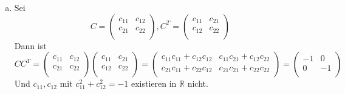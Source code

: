 \documentclass{scrreprt}
\begin{document}
\begin{enumerate}[(a)]
\begin{enumerate}[(a)]
  \item Sei
    \[
      C = \begin{pmatrix}
        c_{11} & c_{12} \\
        c_{21} & c_{22} \\
      \end{pmatrix},
      C^T = \begin{pmatrix}
        c_{11} & c_{21} \\
        c_{12} & c_{22} \\
      \end{pmatrix}
    \]
    Dann ist
    \[
      CC^T = \begin{pmatrix}
        c_{11} & c_{12} \\
        c_{21} & c_{22} \\
      \end{pmatrix}\begin{pmatrix}
        c_{11} & c_{21} \\
        c_{12} & c_{22} \\
      \end{pmatrix} = \begin{pmatrix}
        c_{11}c_{11} + c_{12}c_{12} & c_{11}c_{21} + c_{12}c_{22} \\
        c_{21}c_{11} + c_{22}c_{12} & c_{21}c_{21} + c_{22}c_{22} \\
      \end{pmatrix} = \begin{pmatrix}
        -1 & 0  \\
        0  & -1 \\
      \end{pmatrix}
    \]
    Und $c_{11}, c_{12}$ mit $c_{11}^2 + c_{12}^2 = -1$ existieren in
    $\mathbb{R}$ nicht.


\end{enumerate}
\end{enumerate}
\end{document}
